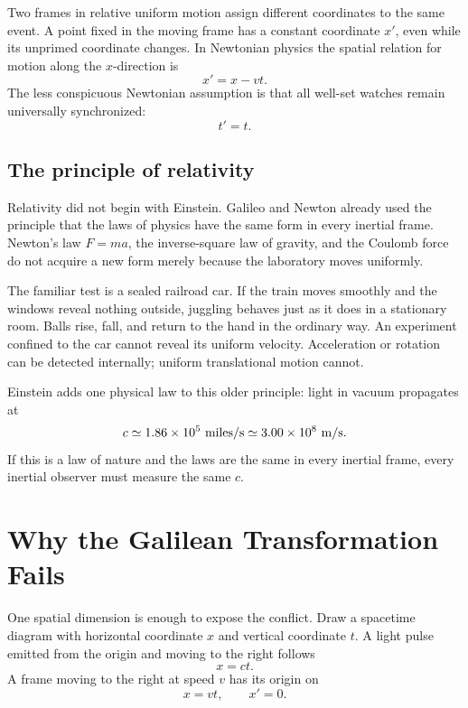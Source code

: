 Two frames in relative uniform motion assign different coordinates to the same event. A point fixed in the moving frame has a constant coordinate \(x'\), even while its unprimed coordinate changes. In Newtonian physics the spatial relation for motion along the \(x\)-direction is
\begin{equation}
x'=x-vt.
\label{eq:sr1-galilean-space}
\end{equation}
The less conspicuous Newtonian assumption is that all well-set watches remain universally synchronized:
\begin{equation}
t'=t.
\label{eq:sr1-absolute-time}
\end{equation}

\subsection{The principle of relativity}

Relativity did not begin with Einstein. Galileo and Newton already used the principle that the laws of physics have the same form in every inertial frame. Newton's law \(F=ma\), the inverse-square law of gravity, and the Coulomb force do not acquire a new form merely because the laboratory moves uniformly.

The familiar test is a sealed railroad car. If the train moves smoothly and the windows reveal nothing outside, juggling behaves just as it does in a stationary room. Balls rise, fall, and return to the hand in the ordinary way. An experiment confined to the car cannot reveal its uniform velocity. Acceleration or rotation can be detected internally; uniform translational motion cannot.

Einstein adds one physical law to this older principle: light in vacuum propagates at
\begin{equation}
c \simeq 1.86\times 10^5\ {\rm miles/s}
   \simeq 3.00\times 10^8\ {\rm m/s}.
\end{equation}
If this is a law of nature and the laws are the same in every inertial frame, every inertial observer must measure the same \(c\).

\section{Why the Galilean Transformation Fails}

One spatial dimension is enough to expose the conflict. Draw a spacetime diagram with horizontal coordinate \(x\) and vertical coordinate \(t\). A light pulse emitted from the origin and moving to the right follows
\begin{equation}
x=ct.
\label{eq:sr1-light-right}
\end{equation}
A frame moving to the right at speed \(v\) has its origin on
\begin{equation}
x=vt,
\qquad
x'=0.
\label{eq:sr1-moving-origin}
\end{equation}

